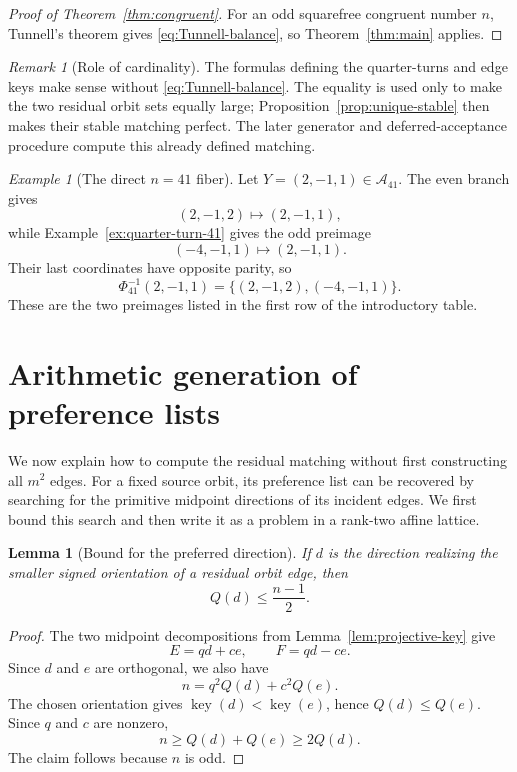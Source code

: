 \documentclass[11pt]{amsart}
\newtheorem{lemma}[theorem]{Lemma}
\theoremstyle{definition}
\theoremstyle{remark}
\newtheorem{remark}[theorem]{Remark}
\newtheorem{example}[theorem]{Example}
\newcommand{\key}{\operatorname{key}}
\begin{document}
\begin{proof}[Proof of Theorem~\ref{thm:congruent}]
For an odd squarefree congruent number $n$, Tunnell's theorem gives
\eqref{eq:Tunnell-balance}, so Theorem~\ref{thm:main} applies.
\end{proof}

\begin{remark}[Role of cardinality]\label{rem:cardinality}
The formulas defining the quarter-turns and edge keys make sense without
\eqref{eq:Tunnell-balance}.  The equality is used only to make the two residual
orbit sets equally large; Proposition~\ref{prop:unique-stable} then makes their
stable matching perfect.  The later generator and deferred-acceptance
procedure compute this already defined matching.
\end{remark}

\begin{example}[The direct $n=41$ fiber]
\label{ex:fiber-41}
Let $Y=(2,-1,1)\in\mathcal A_{41}$.  The even branch gives
\[
 (2,-1,2)\longmapsto(2,-1,1),
\]
while Example~\ref{ex:quarter-turn-41} gives the odd preimage
\[
 (-4,-1,1)\longmapsto(2,-1,1).
\]
Their last coordinates have opposite parity, so
\[
 \Phi_{41}^{-1}(2,-1,1)
 =\{(2,-1,2),(-4,-1,1)\}.
\]
These are the two preimages listed in the first row of the introductory table.
\end{example}

\section{Arithmetic generation of preference lists}\label{sec:affine-stream}

We now explain how to compute the
residual matching without first constructing all $m^2$ edges.  For a fixed
source orbit, its preference list can be recovered by searching for the
primitive midpoint directions of its incident edges.  We first bound this
search and then write it as a problem in a rank-two affine lattice.

\begin{lemma}[Bound for the preferred direction]
\label{lem:projective-half-bound}
If $d$ is the direction realizing the smaller signed orientation of a
residual orbit edge, then
\[
 Q(d)\le\frac{n-1}{2}.
\]
\end{lemma}

\begin{proof}
The two midpoint decompositions from Lemma~\ref{lem:projective-key} give
\[
 E=qd+ce,
 \qquad
 F=qd-ce.
\]
Since $d$ and $e$ are orthogonal, we also have
\[
 n=q^2Q(d)+c^2Q(e).
\]
The chosen orientation gives $\key(d)<\key(e)$, hence $Q(d)\le Q(e)$.  Since
$q$ and $c$ are nonzero,
\[
 n\ge Q(d)+Q(e)\ge2Q(d).
\]
The claim follows because $n$ is odd.
\end{proof}
\end{document}
